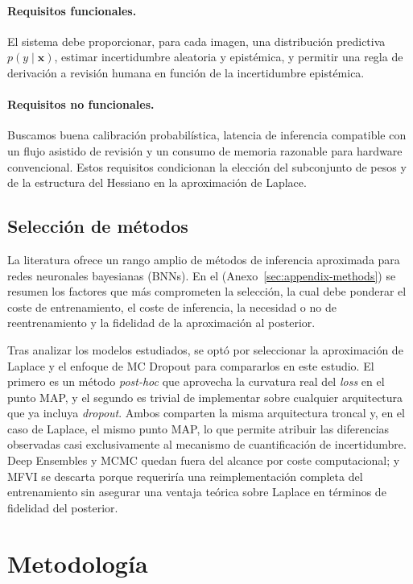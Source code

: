 \documentclass{article}
\begin{document}
\paragraph{Requisitos funcionales.}
El sistema debe proporcionar, para cada imagen, una distribuci\'on
predictiva $p(y\mid \mathbf{x})$, estimar incertidumbre aleatoria y
epist\'emica, y permitir una regla de derivaci\'on a revisi\'on humana en
funci\'on de la incertidumbre epist\'emica.
\paragraph{Requisitos no funcionales.}
Buscamos buena calibraci\'on probabil\'istica, latencia de inferencia
compatible con un flujo asistido de revisi\'on y un consumo de memoria
razonable para hardware convencional. Estos requisitos condicionan la
elecci\'on del subconjunto de pesos y de la estructura del Hessiano en la
aproximaci\'on de Laplace.


\subsection{Selecci\'on de m\'etodos}
\label{sec:methods-tradeoff}
 
La literatura ofrece un rango amplio de m\'etodos de inferencia
aproximada para redes neuronales bayesianas (BNNs). En el (Anexo~\ref{sec:appendix-methods})
se resumen los factores que más comprometen la selección, la cual debe ponderar el coste
de entrenamiento, el coste de inferencia, la necesidad o no de
reentrenamiento y la fidelidad de la aproximaci\'on al posterior.

Tras analizar los modelos estudiados, se optó por seleccionar la aproximación de Laplace
y el enfoque de MC Dropout para compararlos en este estudio. El primero es un método \emph{post-hoc} que aprovecha la curvatura real del \emph{loss} en el punto MAP, 
y el segundo es trivial de implementar sobre cualquier arquitectura que ya incluya \emph{dropout}. Ambos comparten la misma arquitectura troncal y, en el caso de Laplace, el mismo punto MAP, lo que permite atribuir las diferencias observadas casi exclusivamente al mecanismo de cuantificación de incertidumbre.
Deep Ensembles y MCMC quedan fuera del alcance por coste computacional; y MFVI se descarta porque requeriría una reimplementación completa del entrenamiento sin asegurar una ventaja teórica sobre Laplace en términos de fidelidad del posterior.


\section{Metodolog\'ia}
\label{sec:method}
\end{document}
